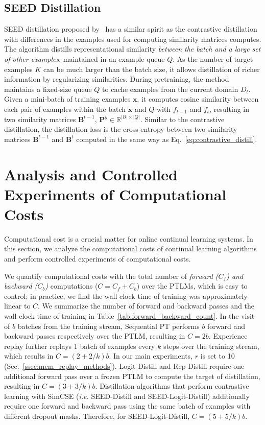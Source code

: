 \subsection{SEED Distillation}
SEED distillation proposed by~\cite{Fang2021SEEDSD} has a similar spirit as the contrastive distillation with differences in the examples used for computing similarity matrices computes. The algorithm distills representational similarity \textit{between the batch and a large set of other examples}, maintained in an example queue $Q$.
As the number of target examples $K$ can be much larger than the batch size, it allows distillation of richer information by regularizing similarities. During pretraining, the method maintains a fixed-size queue $Q$ to cache examples from the current domain $D_t$. Given a mini-batch of training examples $\bm{x}$, it computes cosine similarity between each pair of examples within the batch $\bm{x}$ and $Q$ with $f_{t-1}$ and $f_{t}$, resulting in two similarity matrices $\mathbf{B}^{t-1}$, $\mathbf{P}^y \in \mathbb{R}^{|B|\times |Q|}$. Similar to the contrastive distillation, the distillation loss is the cross-entropy between two similarity matrices $\mathbf{B}^{t-1}$ and $\mathbf{B}^{t}$ computed in the same way as Eq.~\ref{eq:contrastive_distill}. 


\section{Analysis and Controlled Experiments of Computational Costs}
\label{apdx:controlled_computation_costs}

Computational cost is a crucial matter for online continual learning systems. In this section, we analyze the computational costs of continual learning algorithms and perform controlled experiments of computational costs.

We quantify computational costs with the total number of \textit{forward ($C_f$) and backward ($C_b$)} computations ($C=C_f+C_b$) over the PTLMs, which is easy to control; in practice, we find the wall clock time of training was approximately linear to $C$. We summarize the number of forward and backward passes and the wall clock time of training in Table~\ref{tab:forward_backward_count}. In the visit of $b$ batches from the training stream, Sequential PT performs $b$ forward and backward passes respectively over the PTLM, resulting in $C=2b$. Experience replay further replays 1 batch of examples every $k$ steps over the training stream, which results in $C=(2+2/k)b$. In our main experiments, $r$ is set to 10 (Sec.~\ref{ssec:mem_replay_methods}). Logit-Distill and Rep-Distill require one additional forward pass over a frozen PTLM to compute the target of distillation, resulting in $C=(3+3/k)b$. Distillation algorithms that perform contrastive learning with SimCSE (\textit{i.e.} SEED-Distill and SEED-Logit-Distill) additionally require one forward and backward pass using the same batch of examples with different dropout masks. Therefore, for SEED-Logit-Distill, $C=(5+5/k)b$.

